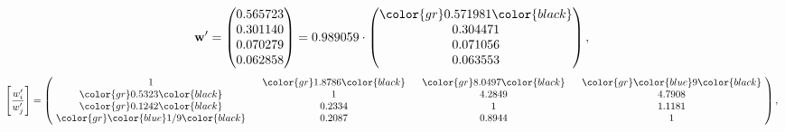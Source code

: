 \begin{example}
\begin{equation*}
\mathbf{w}^{\prime} =
\begin{pmatrix}
0.565723\\
0.301140\\
0.070279\\
0.062858
\end{pmatrix} =
0.989059\cdot
\begin{pmatrix}
\color{gr} 0.571981\color{black} \\
0.304471\\
0.071056\\
0.063553
\end{pmatrix},
\end{equation*}
\begin{equation*}
\left[ \frac{{w}^{\prime}_i}{{w}^{\prime}_j} \right] =
\begin{pmatrix}
$\,\,$ 1 $\,\,$ & $\,\,$\color{gr} 1.8786\color{black} $\,\,$ & $\,\,$\color{gr} 8.0497\color{black} $\,\,$ & $\,\,$\color{gr} \color{blue} 9\color{black} $\,\,$ \\
$\,\,$\color{gr} 0.5323\color{black} $\,\,$ & $\,\,$ 1 $\,\,$ & $\,\,$4.2849$\,\,$ & $\,\,$4.7908  $\,\,$ \\
$\,\,$\color{gr} 0.1242\color{black} $\,\,$ & $\,\,$0.2334$\,\,$ & $\,\,$ 1 $\,\,$ & $\,\,$1.1181 $\,\,$ \\
$\,\,$\color{gr} \color{blue}  1/9\color{black} $\,\,$ & $\,\,$0.2087$\,\,$ & $\,\,$0.8944$\,\,$ & $\,\,$ 1  $\,\,$ \\
\end{pmatrix},
\end{equation*}
\end{example}
\newpage
